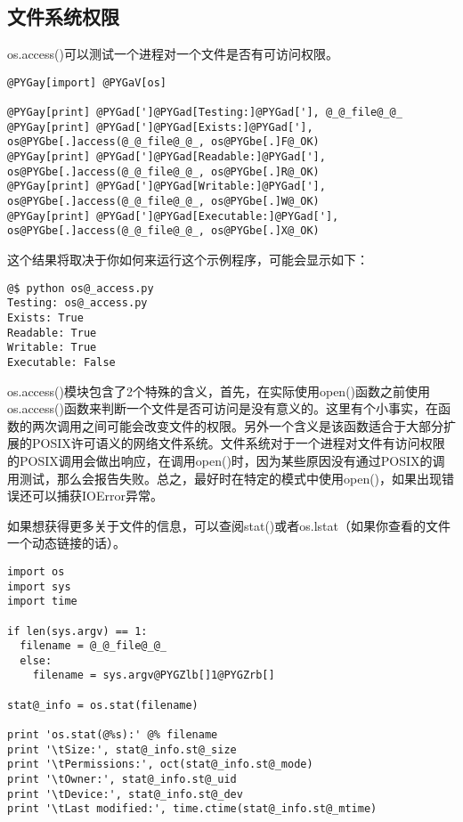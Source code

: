 \documentclass[a4paper,10pt,english]{manual}
\begin{document}
\subsection{文件系统权限}

os.access()可以测试一个进程对一个文件是否有可访问权限。

\begin{Verbatim}[commandchars=@\[\]]
@PYGay[import] @PYGaV[os]

@PYGay[print] @PYGad[']@PYGad[Testing:]@PYGad['], @_@_file@_@_
@PYGay[print] @PYGad[']@PYGad[Exists:]@PYGad['], os@PYGbe[.]access(@_@_file@_@_, os@PYGbe[.]F@_OK)
@PYGay[print] @PYGad[']@PYGad[Readable:]@PYGad['], os@PYGbe[.]access(@_@_file@_@_, os@PYGbe[.]R@_OK)
@PYGay[print] @PYGad[']@PYGad[Writable:]@PYGad['], os@PYGbe[.]access(@_@_file@_@_, os@PYGbe[.]W@_OK)
@PYGay[print] @PYGad[']@PYGad[Executable:]@PYGad['], os@PYGbe[.]access(@_@_file@_@_, os@PYGbe[.]X@_OK)
\end{Verbatim}

这个结果将取决于你如何来运行这个示例程序，可能会显示如下：

\begin{Verbatim}[commandchars=@\[\]]
@$ python os@_access.py
Testing: os@_access.py
Exists: True
Readable: True
Writable: True
Executable: False
\end{Verbatim}

os.access()模块包含了2个特殊的含义，首先，在实际使用open()函数之前使用os.access()函数来判断一个文件是否可访问是没有意义的。这里有个小事实，在函数的两次调用之间可能会改变文件的权限。另外一个含义是该函数适合于大部分扩展的POSIX许可语义的网络文件系统。文件系统对于一个进程对文件有访问权限的POSIX调用会做出响应，在调用open()时，因为某些原因没有通过POSIX的调用测试，那么会报告失败。总之，最好时在特定的模式中使用open()，如果出现错误还可以捕获IOError异常。

如果想获得更多关于文件的信息，可以查阅stat()或者os.lstat（如果你查看的文件一个动态链接的话）。

\begin{Verbatim}[commandchars=@\[\]]
import os
import sys
import time

if len(sys.argv) == 1:
  filename = @_@_file@_@_
  else:
    filename = sys.argv@PYGZlb[]1@PYGZrb[]

stat@_info = os.stat(filename)

print 'os.stat(@%s):' @% filename
print '\tSize:', stat@_info.st@_size
print '\tPermissions:', oct(stat@_info.st@_mode)
print '\tOwner:', stat@_info.st@_uid
print '\tDevice:', stat@_info.st@_dev
print '\tLast modified:', time.ctime(stat@_info.st@_mtime)
\end{Verbatim}
\end{document}
